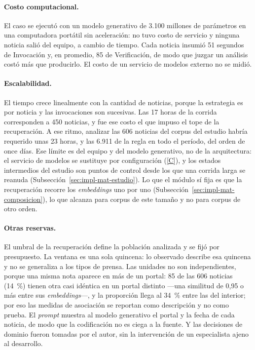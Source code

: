\documentclass[12pt]{report}
\DeclareRobustCommand{\resp}[1]{\hyperref[tab:registro-responsabilidades]{\textcolor{respcolor}{[#1]}}}
\begin{document}
\paragraph{Costo computacional.} El caso se ejecutó con un modelo generativo de 3.100 millones de parámetros en una computadora portátil sin aceleración: no tuvo costo de servicio y ninguna noticia salió del equipo, a cambio de tiempo. Cada noticia insumió 51 segundos de Invocación y, en promedio, 85 de Verificación, de modo que juzgar un análisis costó más que producirlo. El costo de un servicio de modelos externo no se midió.

\paragraph{Escalabilidad.} El tiempo crece linealmente con la cantidad de noticias, porque la estrategia es por noticia y las invocaciones son sucesivas. Las 17 horas de la corrida corresponden a 450 noticias, y fue ese costo el que impuso el tope de la recuperación. A ese ritmo, analizar las 606 noticias del corpus del estudio habría requerido unas 23 horas, y las 6.911 de la regla en todo el período, del orden de once días. Ese límite es del equipo y del modelo generativo, no de la arquitectura: el servicio de modelos se sustituye por configuración (\resp{C}), y los estados intermedios del estudio son puntos de control desde los que una corrida larga se reanuda (Subsección~\ref{sec:impl-mat-estudio}). Lo que el módulo sí fija es que la recuperación recorre los \textit{embeddings} uno por uno (Subsección~\ref{sec:impl-mat-composicion}), lo que alcanza para corpus de este tamaño y no para corpus de otro orden.

\paragraph{Otras reservas.} El umbral de la recuperación define la población analizada y se fijó por presupuesto. La ventana es una sola quincena: lo observado describe esa quincena y no se generaliza a los tipos de prensa. Las unidades no son independientes, porque una misma nota aparece en más de un portal: 85 de las 606 noticias (14~\%) tienen otra casi idéntica en un portal distinto ---una similitud de 0,95 o más entre sus \textit{embeddings}---, y la proporción llega al 34~\% entre las del interior; por eso las medidas de asociación se reportan como descripción y no como prueba. El \textit{prompt} muestra al modelo generativo el portal y la fecha de cada noticia, de modo que la codificación no es ciega a la fuente. Y las decisiones de dominio fueron tomadas por el autor, sin la intervención de un especialista ajeno al desarrollo.
\end{document}
